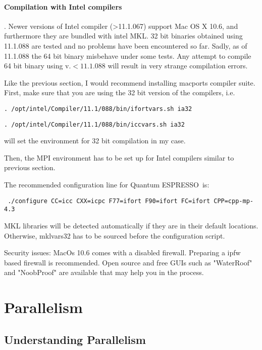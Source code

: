 \documentclass[12pt,a4paper]{article}
\def\qe{{\sc Quantum ESPRESSO}}
\begin{document}
\paragraph{Compilation with Intel compilers}.
Newer versions of Intel compiler (>11.1.067) support Mac OS X 10.6, and furthermore they are
bundled with intel MKL. 32 bit binaries obtained using 11.1.088 are tested and no problems
have been encountered so far. Sadly, as of 11.1.088 the 64 bit binary misbehave 
under some tests. Any attempt to compile 64 bit binary using v.$<11.1.088$ will result in
very strange compilation errors.   

Like the previous section, I would recommend installing macports compiler suite. 
First, make sure that you are using the 32 bit version of the compilers,
i.e.  
\begin{verbatim}
. /opt/intel/Compiler/11.1/088/bin/ifortvars.sh ia32
\end{verbatim}
\begin{verbatim}
. /opt/intel/Compiler/11.1/088/bin/iccvars.sh ia32
\end{verbatim}
will set the environment for 32 bit compilation in my case. 

Then, the MPI environment has to be set up for Intel compilers similar to previous 
section. 

The recommended configuration line for \qe\ is: 
\begin{verbatim}
 ./configure CC=icc CXX=icpc F77=ifort F90=ifort FC=ifort CPP=cpp-mp-4.3
\end{verbatim}
MKL libraries will be detected automatically if they are in their default locations. 
Otherwise, mklvars32 has to be sourced before the configuration script. 

Security issues: 
MacOs 10.6 comes with a disabled firewall. Preparing a ipfw based firewall is recommended. 
Open source and free GUIs such as "WaterRoof" and "NoobProof" are available that may help 
you in the process.

\newpage

\section{Parallelism}
\label{Sec:para}

\subsection{Understanding Parallelism}
\end{document}
